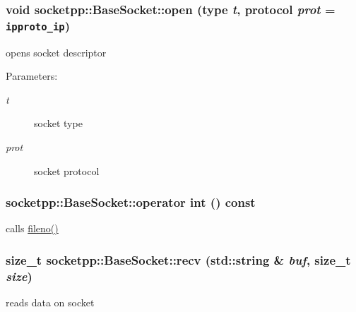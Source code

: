\begin{CompactItemize}
{\subsubsection[{open}]{\setlength{\rightskip}{0pt plus 5cm}void socketpp::BaseSocket::open ({\bf type} {\em t}, \/  {\bf protocol} {\em prot} = {\tt ipproto\_\-ip})}}
\label{classsocketpp_1_1BaseSocket_2060dc1b648f83f8bf5ae3d9ecfcd619}


opens socket descriptor 

\begin{Desc}
\item[Parameters:]
\begin{description}
\item[{\em t}]socket type \item[{\em prot}]socket protocol \end{description}
\end{Desc}
\hypertarget{classsocketpp_1_1BaseSocket_fa397f810462fe61238dbbf2d9c42c90}{
\subsubsection[{operator int}]{\setlength{\rightskip}{0pt plus 5cm}socketpp::BaseSocket::operator int () const}}
\label{classsocketpp_1_1BaseSocket_fa397f810462fe61238dbbf2d9c42c90}


calls \hyperlink{classsocketpp_1_1BaseSocket_c96db07cc917926d895d89cf73734ea1}{fileno()} 

\hypertarget{classsocketpp_1_1BaseSocket_25fc62d259f6d12f1b1a5001a7512897}{
\subsubsection[{recv}]{\setlength{\rightskip}{0pt plus 5cm}size\_\-t socketpp::BaseSocket::recv (std::string \& {\em buf}, \/  size\_\-t {\em size})}}
\label{classsocketpp_1_1BaseSocket_25fc62d259f6d12f1b1a5001a7512897}


reads data on socket 


\end{CompactItemize}
